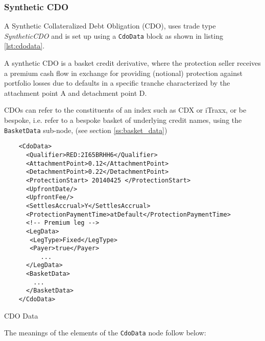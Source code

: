 \subsubsection{Synthetic CDO}

A Synthetic Collateralized Debt Obligation (CDO), uses trade type \emph{SyntheticCDO} and is set up using a {\tt  CdoData} block as shown in listing \ref{lst:cdodata}.

A synthetic CDO is a basket credit derivative, where
the protection seller receives a premium cash flow in exchange for providing (notional)
protection against portfolio losses due to defaults in a specific tranche characterized by
the attachment point A and detachment point D.

CDOs can refer to the constituents of an index such as CDX or iTraxx, or be bespoke, i.e. refer to a bespoke basket of underlying credit names, using the \lstinline!BasketData! sub-node, (see section \ref{ss:basket_data})

\begin{listing}[H]
\begin{verbatim}
    <CdoData>
      <Qualifier>RED:2I65BRHH6</Qualifier>
      <AttachmentPoint>0.12</AttachmentPoint>
      <DetachmentPoint>0.22</DetachmentPoint>
      <ProtectionStart> 20140425 </ProtectionStart>
      <UpfrontDate/>
      <UpfrontFee/>
      <SettlesAccrual>Y</SettlesAccrual>
      <ProtectionPaymentTime>atDefault</ProtectionPaymentTime>
      <!-- Premium leg -->
      <LegData>
       <LegType>Fixed</LegType>
       <Payer>true</Payer>
          ...
      </LegData>
      <BasketData>
        ...
      </BasketData>
    </CdoData>
\end{verbatim}
\caption{CDO Data}
\label{lst:cdodata}
\end{listing}

The meanings of the elements of the {\tt CdoData}  node follow below:

